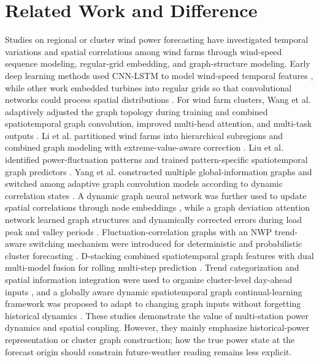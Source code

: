 \section{Related Work and Difference}

Studies on regional or cluster wind power forecasting have investigated temporal variations and spatial correlations among wind farms through wind-speed sequence modeling, regular-grid embedding, and graph-structure modeling. Early deep learning methods used CNN-LSTM to model wind-speed temporal features \cite{ref1}, while other work embedded turbines into regular grids so that convolutional networks could process spatial distributions \cite{ref2}. For wind farm clusters, Wang et al. adaptively adjusted the graph topology during training and combined spatiotemporal graph convolution, improved multi-head attention, and multi-task outputs \cite{ref3}. Li et al. partitioned wind farms into hierarchical subregions and combined graph modeling with extreme-value-aware correction \cite{ref4}. Liu et al. identified power-fluctuation patterns and trained pattern-specific spatiotemporal graph predictors \cite{ref5}. Yang et al. constructed multiple global-information graphs and switched among adaptive graph convolution models according to dynamic correlation states \cite{ref6}. A dynamic graph neural network was further used to update spatial correlations through node embeddings \cite{ref7}, while a graph deviation attention network learned graph structures and dynamically corrected errors during load peak and valley periods \cite{ref8}. Fluctuation-correlation graphs with an NWP trend-aware switching mechanism were introduced for deterministic and probabilistic cluster forecasting \cite{ref9}. D-stacking combined spatiotemporal graph features with dual multi-model fusion for rolling multi-step prediction \cite{ref10}. Trend categorization and spatial information integration were used to organize cluster-level day-ahead inputs \cite{ref11}, and a globally aware dynamic spatiotemporal graph continual-learning framework was proposed to adapt to changing graph inputs without forgetting historical dynamics \cite{ref12}. These studies demonstrate the value of multi-station power dynamics and spatial coupling. However, they mainly emphasize historical-power representation or cluster graph construction; how the true power state at the forecast origin should constrain future-weather reading remains less explicit.

